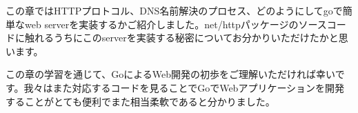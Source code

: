 この章ではHTTPプロトコル、DNS名前解決のプロセス、どのようにしてgoで簡単なweb serverを実装するかご紹介しました。net/httpパッケージのソースコードに触れるうちにこのserverを実装する秘密についてお分かりいただけたかと思います。

この章の学習を通じて、GoによるWeb開発の初歩をご理解いただければ幸いです。我々はまた対応するコードを見ることでGoでWebアプリケーションを開発することがとても便利でまた相当柔軟であると分かりました。
